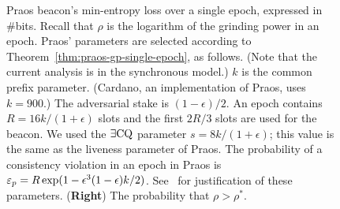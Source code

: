 \begin{figure}[!htb]
{    Praos beacon's min-entropy loss over a single epoch, 
    expressed in \#bits.  
    Recall that $\rho$ is the logarithm of the grinding power in an epoch.     
    Praos' parameters are selected according to Theorem~\ref{thm:praos-gp-single-epoch}, 
    as follows.
    (Note that the current analysis is in the synchronous model.)
    $k$ is the common prefix parameter. 
    (Cardano, an implementation of Praos, uses $k = 900$.) 
    The adversarial stake is $(1-\epsilon)/2$.
    An epoch contains $R = 16 k/(1+\epsilon)$ slots and the first $2R/3$ slots are used for the beacon. 
    We used the $\exists\mathrm{CQ}$ parameter $s = 8 k/(1+\epsilon)$; 
    this value is the same as the liveness parameter of Praos. 
    The probability of a consistency violation in an epoch in Praos is 
    $\mathsf{\varepsilon}_p = R \exp(1-\epsilon^3 (1-\epsilon)k/2) $. 
    See~\citet[Theorem 9]{Praos} for justification of these parameters. 
    (\textbf{Right}) The probability that $\rho > \rho^*$.
  }
  \label{fig:praos-beacon-single-epoch}
\end{figure}
